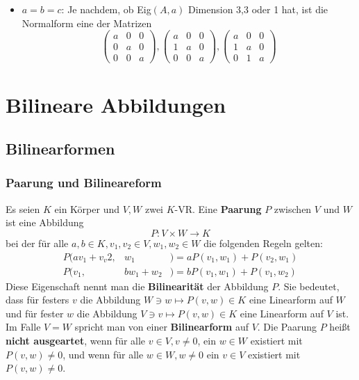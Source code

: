 \documentclass{kit}
\begin{document}
\begin{enumerate}
\begin{itemize}
            \item $a=b=c$: Je nachdem, ob Eig$(A,a)$ Dimension 3,3 oder 1 hat, ist die Normalform eine der Matrizen
              $$\begin{pmatrix} a & 0 & 0 \\ 0 & a & 0 \\ 0 & 0 & a \end{pmatrix},
              \begin{pmatrix} a & 0 & 0 \\ 1 & a & 0 \\ 0 & 0 & a \end{pmatrix},
              \begin{pmatrix} a & 0 & 0 \\ 1 & a & 0 \\ 0 & 1 & a \end{pmatrix}$$
          \end{itemize}
      \end{enumerate}
\section{Bilineare Abbildungen}
  \subsection{Bilinearformen}
    \subsubsection{Paarung und Bilineareform}
      Es seien $K$ ein Körper und $V,W$ zwei $K$-VR. Eine \textbf{Paarung} $P$ zwischen $V$ und $W$ ist eine Abbildung
      $$P:V\times W\longrightarrow K$$
      bei der für alle $a,b\in K,v_1,v_2\in V,w_1,w_2\in W$ die folgenden Regeln gelten:
      $$\begin{array}{lll}
        P(av_1+v_v2, & w_1 & )=aP(v_1,w_1)+P(v_2,w_1)\\
        P(v_1, & bw_1+w_2 & )=bP(v_1,w_1)+P(v_1,w_2)
      \end{array}$$
      Diese Eigenschaft nennt man die \textbf{Bilinearität} der Abbildung $P$. Sie bedeutet, dass für festers $v$ die
      Abbildung $W\ni w\mapsto P(v,w)\in K$ eine Linearform auf $W$ und für fester $w$ die Abbildung 
      $V\ni v\mapsto P(v,w)\in K$ eine Linearform auf $V$ ist.\\
      Im Falle $V=W$ spricht man von einer \textbf{Bilinearform} auf $V$.
      Die Paarung $P$ heißt \textbf{nicht ausgeartet}, wenn für alle $v\in V,v\neq0$, ein $w\in W$ existiert mit 
      $P(v,w)\neq0$, und wenn für alle $w\in W,w\neq0$ ein $v\in V$ existiert mit $P(v,w)\neq0$.\\
\end{document}
